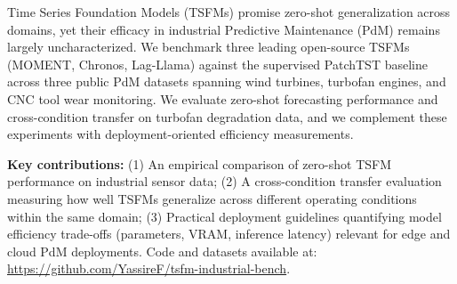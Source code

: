 Time Series Foundation Models (TSFMs) promise zero-shot generalization across domains, yet their efficacy in industrial Predictive Maintenance (PdM) remains largely uncharacterized. We benchmark three leading open-source TSFMs (MOMENT, Chronos, Lag-Llama) against the supervised PatchTST baseline across three public PdM datasets spanning wind turbines, turbofan engines, and CNC tool wear monitoring. We evaluate zero-shot forecasting performance and cross-condition transfer on turbofan degradation data, and we complement these experiments with deployment-oriented efficiency measurements.

\textbf{Key contributions:} (1) An empirical comparison of zero-shot TSFM performance on industrial sensor data; (2) A cross-condition transfer evaluation measuring how well TSFMs generalize across different operating conditions within the same domain; (3) Practical deployment guidelines quantifying model efficiency trade-offs (parameters, VRAM, inference latency) relevant for edge and cloud PdM deployments. Code and datasets available at: \url{https://github.com/YassireF/tsfm-industrial-bench}.
